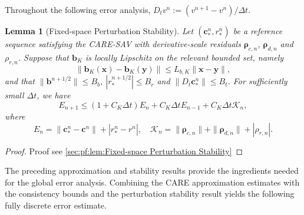 \documentclass[10pt,reqno]{amsart}
\newtheorem{lmm}{\bf Lemma}
\newenvironment{lemma}{\begin{lmm}}{\end{lmm}}
\theoremstyle{remark}
\theoremstyle{definition}
\begin{document}
Throughout the following error analysis, $D_t v^n:=(v^{n+1}-v^n)/\Delta t$.

\begin{lemma}[Fixed-space Perturbation Stability]
\label{lem:Fixed-space Perturbation Stability}
  Let $(\boldsymbol c_*^n,r_*^n)$ be a reference sequence satisfying the CARE-SAV with derivative-scale residuals $\boldsymbol\rho_{c,n}$, $\boldsymbol\rho_{d,n}$ and $\rho_{r,n}$. Suppose that $\boldsymbol b_K$ is locally Lipschitz on the relevant bounded set, namely
  \begin{equation}
    \|\boldsymbol b_K(\boldsymbol x)-\boldsymbol b_K(\boldsymbol y)\|
    \le L_{b,K}\|\boldsymbol x-\boldsymbol y\|,
  \end{equation}
  and that $\|\boldsymbol b^{n+1/2}\|\le B_b$, $|r_*^{n+1/2}|\le B_r$ and $\|D_t\boldsymbol c_*^n\|\le B_t$. For sufficiently small $\Delta t$, we have
  \begin{equation}
    E_{n+1}\le(1+C_K\Delta t)E_n+C_K\Delta t E_{n-1} +C_K\Delta t\mathcal K_n,
  \end{equation}
  where
  $$E_n=\|\boldsymbol c_*^n-\boldsymbol c^n\|+|r_*^n-r^n|,\quad\mathcal K_n=\|\boldsymbol\rho_{c,n}\|+\|\boldsymbol\rho_{d,n}\|+|\rho_{r,n}|.$$
\end{lemma}
\begin{proof}
  Proof see \cref{sec:pf:lem:Fixed-space Perturbation Stability}
\end{proof}

The preceding approximation and stability results provide the ingredients needed for the global error analysis. Combining the CARE approximation estimates with the consistency bounds and the perturbation stability result yields the following fully discrete error estimate.
\end{document}
